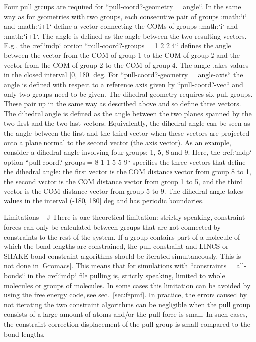 Four pull groups are required for ``pull-coord?-geometry =
angle``. In the same way as for geometries with two groups, each
consecutive pair of groups :math:`i` and :math:`i+1` define a vector
connecting the COMs of groups :math:`i` and :math:`i+1`. The angle is
defined as the angle between the two resulting vectors. E.g., the
:ref:`mdp` option ``pull-coord?-groups = 1 2 2 4``
defines the angle between the vector from the COM of group 1 to the COM
of group 2 and the vector from the COM of group 2 to the COM of group 4.
The angle takes values in the closed interval [0, 180] deg. For
``pull-coord?-geometry = angle-axis`` the angle is defined
with respect to a reference axis given by
``pull-coord?-vec`` and only two groups need to be given.
The dihedral geometry requires six pull groups. These pair up in the
same way as described above and so define three vectors. The dihedral
angle is defined as the angle between the two planes spanned by the two
first and the two last vectors. Equivalently, the dihedral angle can be
seen as the angle between the first and the third vector when these
vectors are projected onto a plane normal to the second vector (the axis
vector). As an example, consider a dihedral angle involving four groups:
1, 5, 8 and 9. Here, the :ref:`mdp` option
``pull-coord?-groups = 8 1 1 5 5 9`` specifies the three
vectors that define the dihedral angle: the first vector is the COM
distance vector from group 8 to 1, the second vector is the COM distance
vector from group 1 to 5, and the third vector is the COM distance
vector from group 5 to 9. The dihedral angle takes values in the
interval (-180, 180] deg and has periodic boundaries.

Limitations
^^^^^^^^^^^

There is one theoretical limitation: strictly speaking, constraint
forces can only be calculated between groups that are not connected by
constraints to the rest of the system. If a group contains part of a
molecule of which the bond lengths are constrained, the pull constraint
and LINCS or SHAKE bond constraint algorithms should be iterated
simultaneously. This is not done in |Gromacs|. This means that for
simulations with ``constraints = all-bonds`` in the :ref:`mdp` file pulling is,
strictly speaking, limited to whole molecules or groups of molecules. In
some cases this limitation can be avoided by using the free energy code,
see sec. [sec:fepmf]. In practice, the errors caused by not iterating
the two constraint algorithms can be negligible when the pull group
consists of a large amount of atoms and/or the pull force is small. In
such cases, the constraint correction displacement of the pull group is
small compared to the bond lengths.

